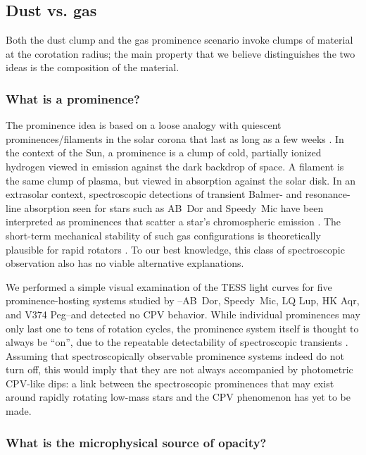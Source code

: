 \documentclass[11pt,twocolumn,tighten]{aastex63}
\begin{document}
\subsection{Dust vs. gas}

Both the dust clump and the gas prominence scenario invoke clumps
of material at the corotation radius;
the main property that we believe distinguishes the two ideas is 
the composition of the material.

\subsubsection{What is a prominence?}
The prominence idea is based on a loose analogy with quiescent
prominences/filaments in the solar corona that last as long as a few
weeks \citep[see][]{2015ASSL..415.....V}.  In the context of the Sun,
a prominence is a clump of cold, partially ionized hydrogen viewed in
emission against the dark backdrop of space.  A filament is the same
clump of plasma, but viewed in absorption against the solar disk.  In
an extrasolar context, spectroscopic detections of transient Balmer-
and resonance-line absorption seen for stars such as AB~Dor and
Speedy~Mic
\citep[e.g.][]{1989MNRAS.238..657C,1993MNRAS.262..369J,2006MNRAS.365..530D,2016MNRAS.463..965L}
have been interpreted as prominences that scatter a star's
chromospheric emission \citep[see][]{1989MNRAS.238..657C}.  The
short-term mechanical stability of such gas configurations is
theoretically plausible for rapid rotators
\citep{2000MNRAS.316..647F,2022MNRAS.514.5465W}.   To our best
knowledge, this class of spectroscopic observation also has no viable
alternative explanations.

We performed a simple visual examination of the TESS light curves for
five prominence-hosting systems studied by
\citet{2019MNRAS.482.2853J}--AB~Dor, Speedy~Mic, LQ Lup, HK Aqr, and
V374 Peg--and detected no CPV behavior.  While individual prominences
may only last one to tens of rotation cycles, the prominence system
itself is thought to always be ``on'', due to the repeatable
detectability of spectroscopic transients \citep[e.g.][and references
therein]{1990MNRAS.247..415C}.  Assuming that spectroscopically
observable prominence systems indeed do not turn off, this would imply
that they are not always accompanied by photometric CPV-like dips: a
link between the spectroscopic prominences that may exist around
rapidly rotating low-mass stars and the CPV phenomenon has yet to be
made.  


\subsubsection{What is the microphysical source of opacity?}
\end{document}

